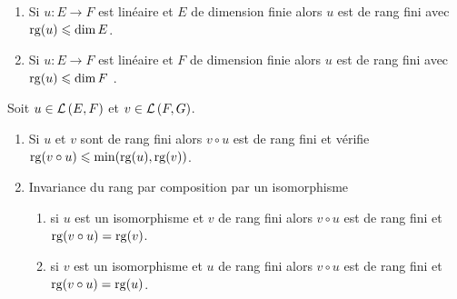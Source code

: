 \begin{defprop}
    \begin{enumerate}
        \item Si \(u : E \to F\) est linéaire et \(E\) de dimension finie alors \(u\) est de rang fini avec \(\operatorname{rg}(u) \leqslant \dim E\).
        \item Si \(u : E \to F\) est linéaire et \(F\) de dimension finie alors \(u\) est de rang fini avec \(\operatorname{rg}(u) \leqslant \dim F\) .
    \end{enumerate}
    \end{defprop}

\begin{defprop}
    Soit \(u \in  \mathcal{L}\left(E,F\right)\) et \(v \in  \mathcal{L}\left(F, G\right)\).\\
    \begin{enumerate}
        \item Si \(u\) et \(v\) sont de rang fini alors \(v \circ u\) est de rang fini et vérifie \(\operatorname{rg} (v \circ u) \leqslant \min(\operatorname{rg}(u), \operatorname{rg}(v))\).
        \item Invariance du rang par composition par un isomorphisme
        \begin{enumerate}
            \item si \(u\) est un isomorphisme et \(v\) de rang fini alors \(v \circ u\) est de rang fini et \(\operatorname{rg} (v \circ u) = \operatorname{rg} (v)\).
            \item si \(v\) est un isomorphisme et \(u\) de rang fini alors \(v \circ u\) est de rang fini et \(\operatorname{rg} (v \circ u) = \operatorname{rg} (u)\).
        \end{enumerate}
    \end{enumerate}
\end{defprop}
